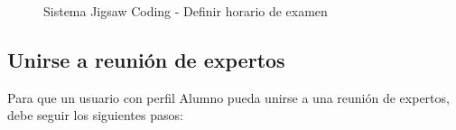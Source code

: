 \begin{enumerate}
\begin{figure}[h!]
		\centering
		\caption{Sistema Jigsaw Coding - Definir horario de examen}
		\label{fig:sesionesjigsaw_nuevo_15}
	\end{figure}
\end{enumerate}

\subsection{Unirse a reunión de expertos}
Para que un usuario con perfil Alumno pueda unirse a una reunión de expertos, debe seguir los siguientes pasos:

